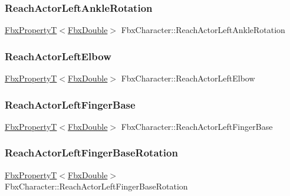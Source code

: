 \subsubsection{\texorpdfstring{Reach\+Actor\+Left\+Ankle\+Rotation}{ReachActorLeftAnkleRotation}}
{\footnotesize\ttfamily \hyperlink{class_fbx_property_t}{Fbx\+PropertyT}$<$\hyperlink{fbxtypes_8h_a171e72a1c46fc15c1a6c9c31948c1c5b}{Fbx\+Double}$>$ Fbx\+Character\+::\+Reach\+Actor\+Left\+Ankle\+Rotation}

\mbox{\label{class_fbx_character_aa87b8af4ec39d88b0fe5ff69c1a9072f}} 
\subsubsection{\texorpdfstring{Reach\+Actor\+Left\+Elbow}{ReachActorLeftElbow}}
{\footnotesize\ttfamily \hyperlink{class_fbx_property_t}{Fbx\+PropertyT}$<$\hyperlink{fbxtypes_8h_a171e72a1c46fc15c1a6c9c31948c1c5b}{Fbx\+Double}$>$ Fbx\+Character\+::\+Reach\+Actor\+Left\+Elbow}

\mbox{\label{class_fbx_character_a7e5392f3362125d4af59a89641f7dd5f}} 
\subsubsection{\texorpdfstring{Reach\+Actor\+Left\+Finger\+Base}{ReachActorLeftFingerBase}}
{\footnotesize\ttfamily \hyperlink{class_fbx_property_t}{Fbx\+PropertyT}$<$\hyperlink{fbxtypes_8h_a171e72a1c46fc15c1a6c9c31948c1c5b}{Fbx\+Double}$>$ Fbx\+Character\+::\+Reach\+Actor\+Left\+Finger\+Base}

\mbox{\label{class_fbx_character_aab599341793dd4ed981f7150382d81f3}} 
\subsubsection{\texorpdfstring{Reach\+Actor\+Left\+Finger\+Base\+Rotation}{ReachActorLeftFingerBaseRotation}}
{\footnotesize\ttfamily \hyperlink{class_fbx_property_t}{Fbx\+PropertyT}$<$\hyperlink{fbxtypes_8h_a171e72a1c46fc15c1a6c9c31948c1c5b}{Fbx\+Double}$>$ Fbx\+Character\+::\+Reach\+Actor\+Left\+Finger\+Base\+Rotation}

